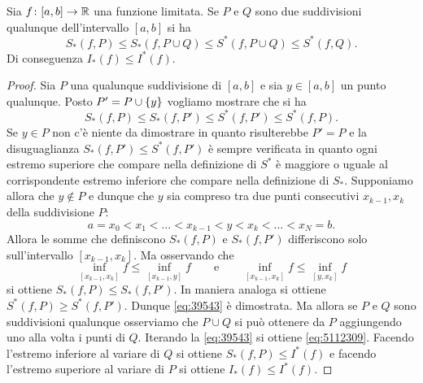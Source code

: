\begin{lemma}
Sia $f\colon[a,b]\to {\mathbb R}$ una funzione limitata.
Se $P$ e $Q$ sono due suddivisioni qualunque dell'intervallo
$[a,b]$ si ha
\begin{equation}\label{eq:5112309}
  S_*(f,P) \le S_*(f,P\cup Q)\le S^*(f,P\cup Q) \le S^*(f,Q).
\end{equation}
Di conseguenza $I_*(f) \le I^*(f)$.
\end{lemma}
\begin{proof}
  Sia $P$ una qualunque suddivisione di $[a,b]$ e sia $y\in [a,b]$ un punto qualunque. Posto $P' = P \cup {\left\{ y \right\}}$ vogliamo mostrare
  che si ha
  \begin{equation}\label{eq:39543}
    S_*(f,P) \le S_*(f,P') \le S^*(f,P') \le S^*(f,P).
  \end{equation}
  Se $y\in P$ non c'è niente da dimostrare in quanto
  risulterebbe $P'=P$ e la disuguaglianza $S_*(f,P') \le S^*(f,P')$ è sempre verificata in quanto ogni estremo superiore che compare nella definizione di $S^*$ è maggiore o uguale al corrispondente
  estremo inferiore che compare nella definizione di $S_*$.
  Supponiamo allora che $y \not \in P$ e dunque che $y$ sia compreso tra due punti consecutivi $x_{k-1}, x_k$ della suddivisione $P$:
  \[
    a= x_0 < x_1 < \dots < x_{k-1} < y < x_k < \dots < x_N=b.
  \]
  Allora le somme che definiscono $S_*(f,P)$ e $S_*(f,P')$ 
  differiscono solo sull'intervallo $[x_{k-1},x_k]$. 
  Ma osservando che
  \[
  \inf_{[x_{k-1}, x_k]}\!\!f
  \le\inf_{[x_{k-1},y]}\!\! f
  \qquad \text{e} \qquad
  \inf_{[x_{k-1}, x_k]}\!\!f
  \le\inf_{[y,x_k]}\!\! f
  \]
  si ottiene $S_*(f,P) \le S_*(f,P')$.
  In maniera analoga si ottiene $S^*(f,P) \ge S^*(f,P')$.
  Dunque \eqref{eq:39543} è dimostrata.
  Ma allora se $P$ e $Q$ sono suddivisioni qualunque osserviamo che $P\cup Q$ 
  si può ottenere da $P$ aggiungendo uno alla volta i punti di $Q$. 
  Iterando la \eqref{eq:39543} si ottiene \eqref{eq:5112309}.
  Facendo l'estremo inferiore al variare di $Q$
  si ottiene $S_*(f,P) \le I^*(f)$ e facendo l'estremo superiore al variare 
  di $P$ si ottiene $I_*(f) \le I^*(f)$.
  \end{proof}


